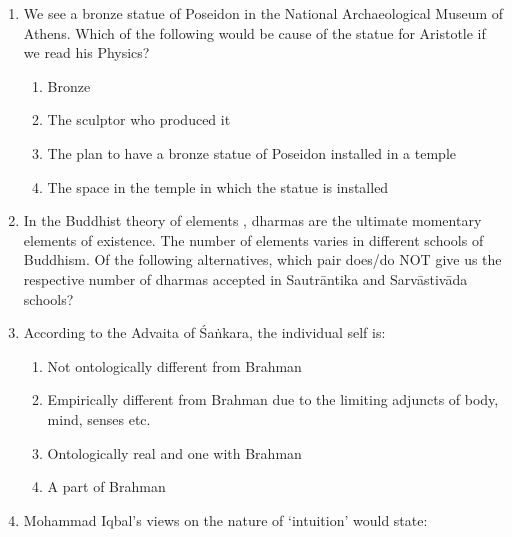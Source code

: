 \documentclass[12pt]{article}
\theoremstyle{remark}
\begin{document}
\begin{enumerate}
\begin{enumerate}
\end{enumerate}
\hfill{}
\item We see a bronze statue of Poseidon in the National Archaeological Museum of Athens. Which of the following would be  cause of the statue for Aristotle if we read his Physics?
\begin{enumerate}
    \item Bronze
    \item The sculptor who produced it
    \item The plan to have a bronze statue of Poseidon installed in a temple
    \item The space in the temple in which the statue is installed
\end{enumerate}
\hfill{}
\item In the Buddhist theory of elements , dharmas are the ultimate momentary elements of existence. The number of elements varies in different schools of Buddhism. Of the following alternatives, which pair does/do NOT give us the respective number of dharmas accepted in Sautr\={a}ntika and Sarv\={a}stiv\={a}da  schools?
\begin{enumerate}
\end{enumerate}
\hfill{}
\item According to the Advaita of \'{S}a\.{n}kara, the individual self  is:
\begin{enumerate}
    \item Not ontologically different from Brahman
    \item Empirically different from Brahman due to the limiting adjuncts of body, mind, senses etc.
    \item Ontologically real and one with Brahman
    \item A part of Brahman
\end{enumerate}
\hfill{}
\item Mohammad Iqbal’s views on the nature of ‘intuition’ would state:
\begin{enumerate}

\end{enumerate}
\end{enumerate}
\end{document}
